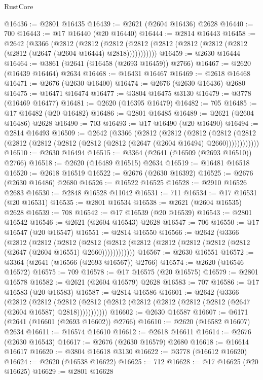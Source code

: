 \begin{lexlean}{RustCore}
\begin{coremodule}
@16436 := @2801 @16435
@16439 := @2621 (@2604 @16436) @2628
@16440 := 700
@16443 := @17 @16440 (@20 @16440)
@16444 := @2814 @16443
@16458 := @2642
    (@3366
      (@2812
        (@2812
          (@2812 (@2812 (@2812 (@2812 (@2812 (@2812 (@2812 (@2647 (@2604 @16444) @2818)))))))))))
@16459 := @2630 @16444
@16464 := @3861 (@2641 (@16458 (@2693 @16459)) @2766)
@16467 := @2620 (@16439 @16464) @2634
@16468 := @16431 @16467
@16469 := @2618 @16468
@16471 := @2676 (@2630 @16400)
@16474 := @2676 (@2630 @16436) @2680
@16475 := @16471 @16474
@16477 := @3804 @16475 @3130
@16479 := @3778 (@16469 @16477)
@16481 := @2620 (@16395 @16479)
@16482 := 705
@16485 := @17 @16482 (@20 @16482)
@16486 := @2801 @16485
@16489 := @2621 (@2604 @16486) @2628
@16490 := 703
@16493 := @17 @16490 (@20 @16490)
@16494 := @2814 @16493
@16509 := @2642
    (@3366
      (@2812
        (@2812
          (@2812
            (@2812 (@2812 (@2812 (@2812 (@2812 (@2812 (@2812 (@2647 (@2604 @16494) @2660))))))))))))
@16510 := @2630 @16494
@16515 := @3364 (@2641 (@16509 (@2693 @16510)) @2766)
@16518 := @2620 (@16489 @16515) @2634
@16519 := @16481 @16518
@16520 := @2618 @16519
@16522 := @2676 (@2630 @16392)
@16525 := @2676 (@2630 @16486) @2680
@16526 := @16522 @16525
@16528 := @2910 @16526 @2683
@16530 := @2848 @16528 @11042
@16531 := 711
@16534 := @17 @16531 (@20 @16531)
@16535 := @2801 @16534
@16538 := @2621 (@2604 @16535) @2628
@16539 := 708
@16542 := @17 @16539 (@20 @16539)
@16543 := @2801 @16542
@16546 := @2621 (@2604 @16543) @2628
@16547 := 706
@16550 := @17 @16547 (@20 @16547)
@16551 := @2814 @16550
@16566 := @2642
    (@3366
      (@2812
        (@2812
          (@2812
            (@2812 (@2812 (@2812 (@2812 (@2812 (@2812 (@2812 (@2647 (@2604 @16551) @2660))))))))))))
@16567 := @2630 @16551
@16572 := @3364 (@2641 (@16566 (@2693 @16567)) @2766)
@16574 := @2620 (@16546 @16572)
@16575 := 709
@16578 := @17 @16575 (@20 @16575)
@16579 := @2801 @16578
@16582 := @2621 (@2604 @16579) @2628
@16583 := 707
@16586 := @17 @16583 (@20 @16583)
@16587 := @2814 @16586
@16601 := @2642
    (@3366
      (@2812
        (@2812
          (@2812 (@2812 (@2812 (@2812 (@2812 (@2812 (@2812 (@2647 (@2604 @16587) @2818)))))))))))
@16602 := @2630 @16587
@16607 := @6171 (@2641 (@16601 (@2693 @16602)) @2766)
@16610 := @2620 (@16582 @16607) @2634
@16611 := @16574 @16610
@16612 := @2618 @16611
@16614 := @2676 (@2630 @16543)
@16617 := @2676 (@2630 @16579) @2680
@16618 := @16614 @16617
@16620 := @3804 @16618 @3130
@16622 := @3778 (@16612 @16620)
@16624 := @2620 (@16538 @16622)
@16625 := 712
@16628 := @17 @16625 (@20 @16625)
@16629 := @2801 @16628

\end{coremodule}
\end{lexlean}
